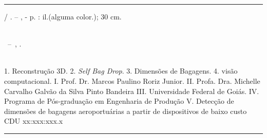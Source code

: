 \imprimircapa
\imprimirfolhaderosto

\begin{fichacatalografica}
    \vspace*{15cm} 
    \hrule 
    \begin{center} 
    \begin{minipage}[c]{12.5cm} 
        \imprimirautor
        \hspace{0.5cm} \imprimirtitulo / \imprimirautor. --
        \imprimirlocal, \imprimirdata-
        \hspace{0.5cm} \pageref{LastPage} p. : il.(alguma color.); 30 cm.\\
        \hspace{0.5cm} \imprimirorientadorRotulo \imprimirorientador\\
        \hspace{0.5cm}
        \parbox[t]{\textwidth}{\imprimirtipotrabalho~--~\imprimirinstituicao,
        \imprimirdata.}\\
        \hspace{0.5cm}
        1. Reconstrução 3D. 
        2. \textit{Self Bag Drop}.
        3. Dimensões de Bagagens.
        4. visão computacional.
        I. Prof. Dr. Marcos Paulino Roriz Junior.
        II. Profa. Dra. Michelle Carvalho Galvão da Silva Pinto Bandeira 
        III. Universidade Federal de Goiás.
        IV. Programa de Pós-graduação em Engenharia de Produção
        V. Detecção de dimensões de bagagens aeroportuárias a partir de dispositivos de baixo custo\\
        \hspace{8.75cm} CDU xx:xxx:xxx.x\\
    \end{minipage}
    \end{center}
    \hrule
\end{fichacatalografica}

